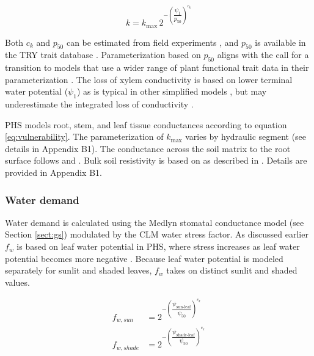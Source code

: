 \documentclass[draft,linenumbers]{agujournal}
\begin{document}
     \begin{linenomath*}
     \begin{equation}
     \label{eq:vulnerability}
     k = k_{\text{max}} \, 2^{-\left(\dfrac{\psi_1}{p_{50}}\right)^{c_k}}
     \end{equation}
     \end{linenomath*}
     
     Both $c_k$ and  $p_{50}$ can be estimated from field experiments \citep{sack2002}, and $p_{50}$ is available in the TRY trait database \citep{kattge2011}. 
     Parameterization based on $p_{50}$ aligns with the call for a transition to models that use a wider range of plant functional trait data in their parameterization \citep{anderegg2015a}. 
     The loss of xylem conductivity is based on lower terminal water potential ($\psi_1$) as is typical in other simplified models \citep{xu2016}, but 
     may underestimate the integrated loss of conductivity \citep{sperry2015}. 
         
     PHS models root, stem, and leaf tissue conductances according to equation \ref{eq:vulnerability}. 
     The parameterization of $k_{\text{max}}$ varies by hydraulic segment (see details in Appendix B1). 
     The conductance across the soil matrix to the root surface follows \citet{williams2001} and \citet{bonan2014}. 
     Bulk soil resistivity is based on \citet{clapp1978} as described in \citet{oleson2013}. 
     Details are provided in Appendix B1.
    
    \subsubsection{Water demand}
    \label{sect:demand}
    
    Water demand is calculated using the Medlyn stomatal conductance model (see Section \ref{sect:gs}) modulated by the CLM water stress factor.
    As discussed earlier $f_w$ is based on leaf water potential in PHS, where stress increases as leaf water potential becomes more negative \citep{klein2014}.
    Because leaf water potential is modeled separately for sunlit and shaded leaves, $f_w$ takes on distinct sunlit and shaded values.
    
     \begin{linenomath*}
     \begin{equation}
     \begin{aligned}
     \label{eq:d1}
     f_{w,sun} &= 2^{-\left(\dfrac{\psi_{\text{sun-leaf}}}{\psi_{50}}\right)^{c_k}} \\
     f_{w,shade} &= 2^{-\left(\dfrac{\psi_{\text{shade-leaf}}}{\psi_{50}}\right)^{c_k}}
     \end{aligned}     
     \end{equation}
     \end{linenomath*}
     
\end{document}
